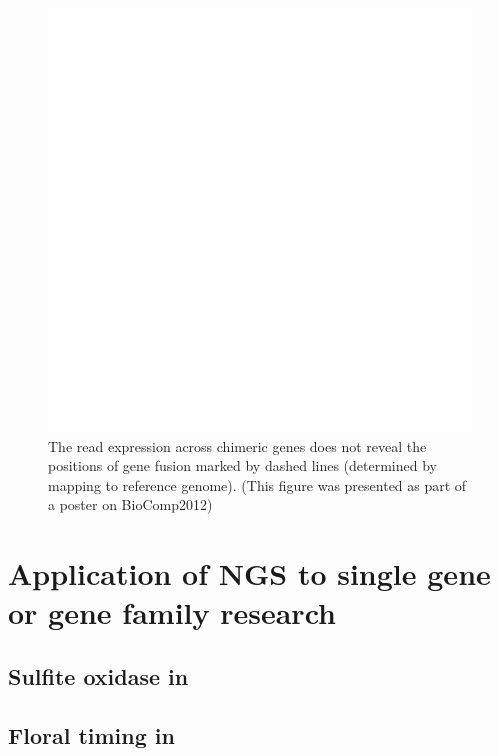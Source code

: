 		\begin{figure}%
			\includegraphics[width=\columnwidth]{images/conclusions_chimeraByExpression}%
			\caption{The read expression across chimeric genes does not reveal the positions of gene fusion marked by dashed lines (determined by mapping to reference genome). (This figure was presented as part of a poster on BioComp2012)}%
			\label{fig:conclusions_chimeraByExpression}%
		\end{figure}
	
 \section{Application of NGS to single gene or gene family research}
 \subsection{Sulfite oxidase in }
 \subsection{Floral timing in }
 
